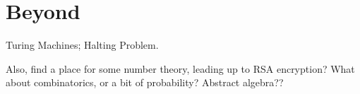 
\chapter{Beyond}
Turing Machines; Halting Problem.

Also, find a place for some number theory, leading up to RSA encryption? What about combinatorics, or a bit of probability? Abstract algebra??
